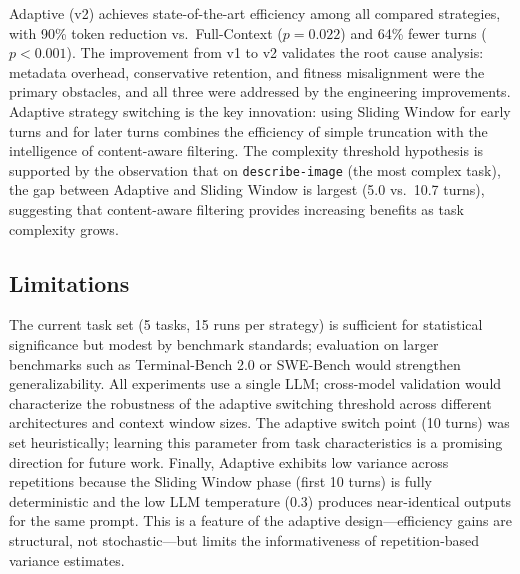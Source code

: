 Adaptive \EpiContext{} (v2) achieves state-of-the-art efficiency among all compared strategies, with 90\% token reduction vs.\ Full-Context ($p = 0.022$) and 64\% fewer turns ($p < 0.001$). The improvement from v1 to v2 validates the root cause analysis: metadata overhead, conservative retention, and fitness misalignment were the primary obstacles, and all three were addressed by the engineering improvements. Adaptive strategy switching is the key innovation: using Sliding Window for early turns and \EpiContext{} for later turns combines the efficiency of simple truncation with the intelligence of content-aware filtering. The complexity threshold hypothesis is supported by the observation that on \texttt{describe-image} (the most complex task), the gap between Adaptive \EpiContext{} and Sliding Window is largest (5.0 vs.\ 10.7 turns), suggesting that content-aware filtering provides increasing benefits as task complexity grows.

\subsection{Limitations}

The current task set (5 tasks, 15 runs per strategy) is sufficient for statistical significance but modest by benchmark standards; evaluation on larger benchmarks such as Terminal-Bench 2.0 or SWE-Bench would strengthen generalizability. All experiments use a single LLM; cross-model validation would characterize the robustness of the adaptive switching threshold across different architectures and context window sizes. The adaptive switch point (10 turns) was set heuristically; learning this parameter from task characteristics is a promising direction for future work. Finally, Adaptive \EpiContext{} exhibits low variance across repetitions because the Sliding Window phase (first 10 turns) is fully deterministic and the low LLM temperature (0.3) produces near-identical outputs for the same prompt. This is a feature of the adaptive design---efficiency gains are structural, not stochastic---but limits the informativeness of repetition-based variance estimates.